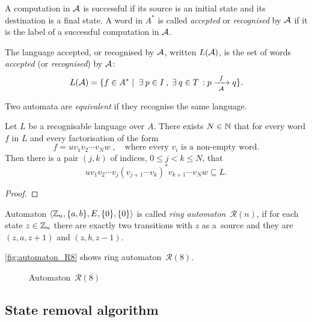 A computation in ${\mathcal{A}}$ is successful if its source is an initial state and its destination is a final state. A word in $A^*$ is called \emph{accepted} or \emph{recognised} by ${\mathcal{A}}$ if it is the label of a successful computation in ${\mathcal{A}}$.

\begin{defn}
    The language accepted, or recognised by ${\mathcal{A}}$, written $L({\mathcal{A}})$, is the set of words \emph{accepted} (or \emph{recognised}) by ${\mathcal{A}}$:
    \[
        L({\mathcal{A}}) = \{ f \in A^* \mid \; \exists \: p \in I \: , \; \exists \: q \in T \, : p {\; \xrightarrow[{\mathcal{A}}]{\: \; f \: \;} \;} q \}.
    \]
\end{defn}

Two automata are \emph{equivalent} if they recognise the same language.

\begin{lemma}\label{lm:block_star_lemma}
    Let $L$ be a recognisable language over $A$. There exists $N \in \mathbb{N}$ that for every word $f$ in $L$ and every factorisation of the form
    \[
        f = u v_1 v_2 \dotsm v_N w \; , \quad \text{where every $v_i$ is a non-empty word.}
    \]
    Then there is a pair $(j,k)$ of indices, $0 \leq j < k \leq N$, that
    \[
        u v_1 v_2 \dotsm v_j {(v_{j+1} \dotsm v_k)}^* v_{k+1} \dotsm v_N w \subseteq L.
    \]
\end{lemma}

\begin{proof}
\end{proof}

\begin{defn}
    Automaton $\langle \mathbb{Z}_n, \{a,b\}, E, \{0\}, \{0\} \rangle$ is called \emph{ring automaton~${\mathcal{R}(n)}$}, if for each state $z \in \mathbb{Z}_n$ there are exactly two transitions with $z$ as a~source and they are $(z, a, z+1)$ and $(z, b, z-1)$.
\end{defn}

\begin{example}
    \autoref*{fig:automaton_R8} shows ring automaton~${\mathcal{R}(8)}$.

    \begin{figure}[h]
        \centering
        
        \caption{Automaton~${\mathcal{R}(8)}$}\label{fig:automaton_R8}
    \end{figure}
\end{example}

\subsection{State removal algorithm}


